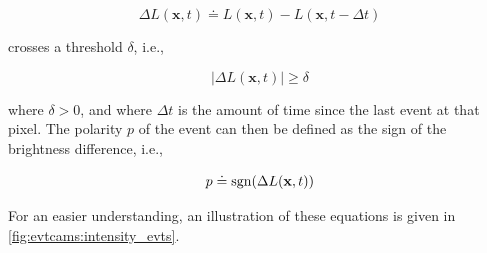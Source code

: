 \begin{equation}\label{eq:evtcams:delta_l}
  \Delta L(\mathbf{x}, t) \doteq L(\mathbf{x}, t) - L(\mathbf{x}, t - \Delta t)
\end{equation}

crosses a threshold \(\delta\), i.e.,

\begin{equation}\label{eq:evtcams:delta_l_thr}
  |\Delta L(\mathbf{x}, t)| \geq \delta
\end{equation}

where \(\delta > 0\), and where \(\Delta t\) is the amount of time since the last event at that pixel. The polarity \(p\) of the event can then be defined as the sign of the brightness difference, i.e.,

\begin{equation}
  p \doteq \operatorname{sgn}(\Delta L(\mathbf{x}, t))
\end{equation}

For an easier understanding, an illustration of these equations is given in \cref{fig:evtcams:intensity_evts}.

